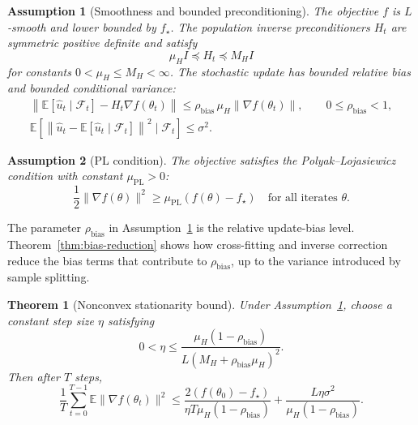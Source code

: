 \documentclass{article}
\newcommand{\E}{\mathbb{E}}
\newtheorem{assumption}{Assumption}
\newtheorem{theorem}{Theorem}
\begin{document}
\begin{assumption}[Smoothness and bounded preconditioning]
\label{ass:smooth}
The objective $f$ is $L$-smooth and lower bounded by $f_\star$. The population inverse preconditioners $H_t$ are symmetric positive definite and satisfy
\begin{equation}
    \mu_H I \preceq H_t \preceq M_H I
\end{equation}
for constants $0<\mu_H\le M_H<\infty$. The stochastic update has bounded relative bias and bounded conditional variance:
\begin{equation}
    \begin{aligned}
    \left\|
    \E[\hat u_t\mid\mathcal F_t]
    -
    H_t\nabla f(\theta_t)
    \right\|
    \le
    \rho_{\mathrm{bias}}\,\mu_H\|\nabla f(\theta_t)\|,
    \qquad
    0\le \rho_{\mathrm{bias}}<1,\\
    \E\!\left[
    \left\|
    \hat u_t-\E[\hat u_t\mid\mathcal F_t]
    \right\|^2
    \mid\mathcal F_t
    \right]
    \le
    \sigma^2.
    \end{aligned}
\end{equation}
\end{assumption}

\begin{assumption}[PL condition]
\label{ass:pl}
The objective satisfies the Polyak--Lojasiewicz condition with constant $\mu_{\mathrm{PL}}>0$:
\begin{equation}
    \frac{1}{2}\|\nabla f(\theta)\|^2
    \ge
    \mu_{\mathrm{PL}}(f(\theta)-f_\star)
    \quad
    \text{for all iterates } \theta.
\end{equation}
\end{assumption}

The parameter $\rho_{\mathrm{bias}}$ in Assumption~\ref{ass:smooth} is the relative update-bias level. Theorem~\ref{thm:bias-reduction} shows how cross-fitting and inverse correction reduce the bias terms that contribute to $\rho_{\mathrm{bias}}$, up to the variance introduced by sample splitting.

\begin{theorem}[Nonconvex stationarity bound]
\label{thm:nonconvex}
Under Assumption~\ref{ass:smooth}, choose a constant step size $\eta$ satisfying
\begin{equation}
    0<\eta
    \le
    \frac{\mu_H(1-\rho_{\mathrm{bias}})}
    {L(M_H+\rho_{\mathrm{bias}}\mu_H)^2}.
\end{equation}
Then after $T$ steps,
\begin{equation}
    \frac{1}{T}
    \sum_{t=0}^{T-1}
    \E\|\nabla f(\theta_t)\|^2
    \le
    \frac{2(f(\theta_0)-f_\star)}
    {\eta T\mu_H(1-\rho_{\mathrm{bias}})}
    +
    \frac{L\eta\sigma^2}
    {\mu_H(1-\rho_{\mathrm{bias}})}.
\end{equation}
\end{theorem}
\end{document}
